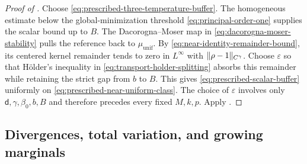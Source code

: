 \documentclass[11pt,reqno]{amsart}
\numberwithin{equation}{section}
\theoremstyle{plain}
\theoremstyle{definition}
\DeclarePairedDelimiter{\norm}{\lVert}{\rVert}
\renewcommand{\d}{\mathsf d}
\newcommand{\be}{\beta}
\newcommand{\vep}{\varepsilon}
\newcommand{\muunif}{\mu_{\mathrm{unif}}}
\begin{document}
\begin{proof}[Proof of ]
Choose \eqref{eq:prescribed-three-temperature-buffer}.  The homogeneous estimate below the global-minimization threshold \eqref{eq:principal-order-one} supplies the scalar bound up to $B$.  The Dacorogna--Moser map in \eqref{eq:dacorogna-moser-stability} pulls the reference back to $\muunif$.  By \eqref{eq:near-identity-remainder-bound}, its centered kernel remainder tends to zero in $L^\infty$ with $\norm{\rho-1}_{C^\gamma}$.  Choose $\vep$ so that H\"older's inequality in \eqref{eq:transport-holder-splitting} absorbs this remainder while retaining the strict gap from $b$ to $B$.  This gives \eqref{eq:prescribed-scalar-buffer} uniformly on \eqref{eq:prescribed-near-uniform-class}.  The choice of $\vep$ involves only $\d,\gamma,\be_0,b,B$ and therefore precedes every fixed $M,k,p$.  Apply .
\end{proof}

\subsection{Divergences, total variation, and growing marginals}
\label{subsec:prescribed-divergences}
\end{document}
